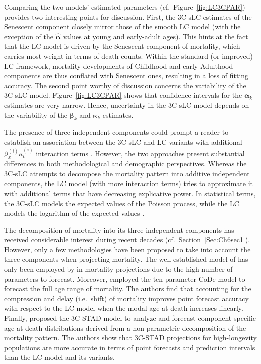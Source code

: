\documentclass[Thesis]{subfiles}
\begin{document}
Comparing the two models' estimated parameters (cf.~Figure~\ref{fig:LC3CPAR}) provides two interesting points for discussion. First, the 3C-sLC estimates of the Senescent component closely mirror those of the smooth LC model (with the exception of the $\bm{\hat{\alpha}}$ values at young and early-adult ages). This hints at the fact that the LC model is driven by the Senescent component of mortality, which carries most weight in terms of death counts. Within the standard (or improved) LC framework, mortality developments of Childhood and early-Adulthood components are thus conflated with Senescent ones, resulting in a loss of fitting accuracy. The second point worthy of discussion concerns the variability of the 3C-sLC model. Figure~\ref{fig:LC3CPAR} shows that confidence intervals for the $\bm{\alpha}_k$ estimates are very narrow. Hence, uncertainty in the 3C-sLC model depends on the variability of the $\bm{\beta}_k$ and $\bm{\kappa}_k$ estimates.

The presence of three independent components could prompt a reader to establish an association between the 3C-sLC and LC variants with additional $\beta^{(i)}_x \kappa^{(i)}_t$ interaction terms \citep{renshaw2003lee, hyndman2007robust}. However, the two approaches present substantial differences in both methodological and demographic perspectives. Whereas the 3C-sLC attempts to decompose the mortality pattern into additive independent components, the LC model (with more interaction terms) tries to approximate it with additional terms that have decreasing explicative power. In statistical terms, the 3C-sLC models the expected values of the Poisson process, while the LC models the logarithm of the expected values \cite[for a more detailed discussion in a general modelling framework, see][p.~279]{camarda2016sums}.

The decomposition of mortality into its three independent components has received considerable interest during recent decades (cf.~Section~\ref{Sec:Ch6sec1}). However, only a few methodologies have been proposed to take into account the three components when projecting mortality. The well-established model of  \cite{heligman1980age} has only been employed by \cite{forfar1987changing} in mortality projections due to the high number of parameters to forecast. Moreover, \cite{bardoutsos2018projecting} employed the ten-parameter CoDe model \citep{de2016new} to forecast the full age range of mortality. The authors find that accounting for the compression and delay (i.e.~shift) of mortality improves point forecast accuracy with respect to the LC model when the modal age at death increases linearly. Finally, \cite{basellini2019three} proposed the 3C-STAD model to analyze and forecast component-specific age-at-death distributions derived from a non-parametric decomposition of the mortality pattern. The authors show that 3C-STAD projections for high-longevity populations are more accurate in terms of point forecasts and prediction intervals than the LC model and its variants. 
\end{document}
